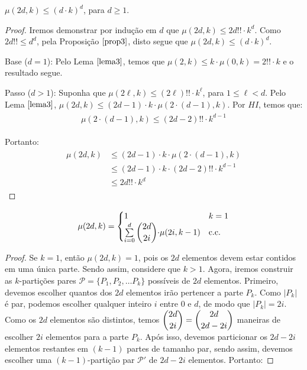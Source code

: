\documentclass[12pt]{article}
\begin{document}
{ 
  \begin{lema}  
 	\label{lema4} 
 	$\mu(2d, k) \leq (d {\cdot} k)^d$, para $d \geq 1$.
 \end{lema}
 
 \begin{proof} Iremos demonstrar por indução em $d$ que $\mu(2d, k) \leq 2d!! \cdot k^d$. Como $2d!! \leq d^d$, pela Proposição $\ref{prop3}$, disto segue que $\mu(2d, k) \leq (d {\cdot} k)^d$. 
 	
 	Base ($d = 1$): Pelo Lema $\ref{lema3}$, temos que $\mu(2, k) \leq k \cdot \mu(0, k)= 2!! \cdot k$ e o resultado segue.
 	
 	Passo ($d > 1$): Suponha que $\mu(2\ell, k) \leq (2\ell)!! \cdot k^{\ell}$, para $1 \leq \ell < d$. Pelo Lema $\ref{lema3}$, $\mu(2d, k) \leq (2d - 1) \cdot k \cdot \mu(2 {\cdot} (d - 1), k)$. Por $HI$, temos que: 
 	\begin{align}
 		\begin{split}
			\mu(2 {\cdot} (d - 1), k) \leq (2d - 2)!! \cdot k^{d-1}
 		\end{split} 
 	\end{align} 
 	
 	Portanto: 
 	\begin{align}
 		\begin{split}
 			\mu(2d, k) &\leq (2d - 1) \cdot k \cdot \mu(2 {\cdot} (d - 1), k) \\
 			&\leq (2d - 1) \cdot k \cdot (2d - 2)!! \cdot k^{d-1} \\
 			&\leq 2d!! \cdot k^d
 		\end{split} 
 	\end{align} 
 	
 \end{proof} \newl
 
 
\begin{lema}   
	\label{lema5}
	\begin{equation}
		\mu(2d, k) =
		\begin{cases}
			1 & \text{$k = 1$} \\
			\sum\limits_{i = 0}^{d} \escolhe{2d}{2i} {\cdot} \mu(2i, k-1) & \text{c.c.} \\ 
		\end{cases}
	\end{equation} 
\end{lema}
 
\begin{proof} 
	Se $k=1$, então $\mu(2d, k) = 1$, pois os $2d$ elementos devem estar contidos em uma única parte. Sendo assim, considere que $k > 1$. Agora, iremos construir as $k$-partições pares $\mathcal{P}=\{P_1, P_2, \ldots P_k\}$ possíveis de $2d$ elementos. Primeiro, devemos escolher quantos dos $2d$ elementos irão pertencer a parte $P_k$. Como $|P_k|$ é par, podemos escolher qualquer inteiro $i$ entre $0$ e $d$, de modo que $|P_k| = 2i$. Como os $2d$ elementos são distintos, temos $\escolhe{2d}{2i} = \escolhe{2d}{2d - 2i}$ maneiras de escolher $2i$ elementos para a parte $P_k$. Após isso, devemos particionar os $2d - 2i$ elementos restantes em $(k-1)$ partes de tamanho par, sendo assim, devemos escolher uma $(k-1)$-partição par $\mathcal{P'}$ de $2d - 2i$ elementos. Portanto: 
	

\end{proof}}
\end{document}
